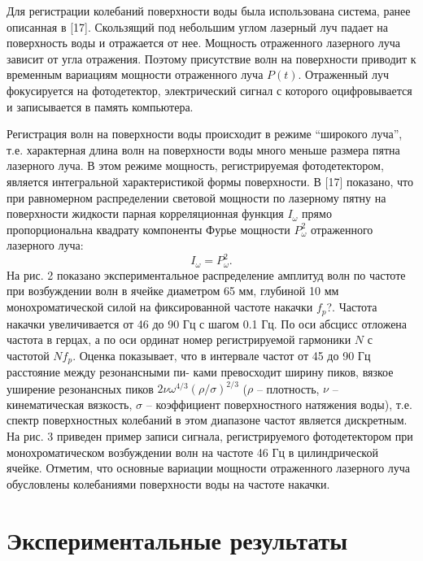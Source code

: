 Для регистрации колебаний поверхности воды была использована система, ранее описанная в [17]. Скользящий под небольшим углом лазерный луч падает на поверхность воды и отражается от нее. Мощность отраженного лазерного луча зависит от угла отражения. Поэтому присутствие волн на поверхности приводит к временным вариациям мощности отраженного луча $P(t)$. Отраженный луч фокусируется на фотодетектор, электрический сигнал с которого оцифровывается и записывается в память компьютера.

Регистрация волн на поверхности воды происходит в режиме “широкого луча”, т.е. характерная длина волн на поверхности воды много меньше размера пятна лазерного луча. В этом режиме мощность, регистрируемая фотодетектором, является интегральной характеристикой формы поверхности. В [17] показано, что при равномерном распределении световой мощности по лазерному пятну на поверхности жидкости парная корреляционная функция $I_\omega$ прямо пропорциональна квадрату компоненты Фурье мощности $P_\omega^2$ отраженного лазерного луча:
\begin{equation}
I_\omega = P_\omega^2.
\end{equation}
На рис. 2 показано экспериментальное распределение амплитуд волн по частоте при возбуждении волн в ячейке диаметром 65 мм, глубиной 10 мм монохроматической силой на фиксированной частоте накачки $f_p$?. Частота накачки увеличивается от 46 до 90 Гц с шагом 0.1 Гц. По оси абсцисс отложена частота в герцах, а по оси ординат номер регистрируемой гармоники $N$ с частотой $N f_p$.
Оценка показывает, что в интервале частот от 45 до 90 Гц расстояние между резонансными пи- ками превосходит ширину пиков, вязкое уширение резонансных пиков $2\nu\omega^{4/3}(\rho/\sigma)^{2/3}$ ($\rho$ – плотность, $\nu$ – кинематическая вязкость, $\sigma$ – коэффициент поверхностного натяжения воды), т.е. спектр поверхностных колебаний в этом диапазоне частот является дискретным.
На рис. 3 приведен пример записи сигнала, регистрируемого фотодетектором при монохроматическом возбуждении волн на частоте 46 Гц в цилиндрической ячейке. Отметим, что основные вариации мощности отраженного лазерного луча обусловлены колебаниями поверхности воды на частоте накачки.


\section{Экспериментальные результаты} \label{sect2_2}

